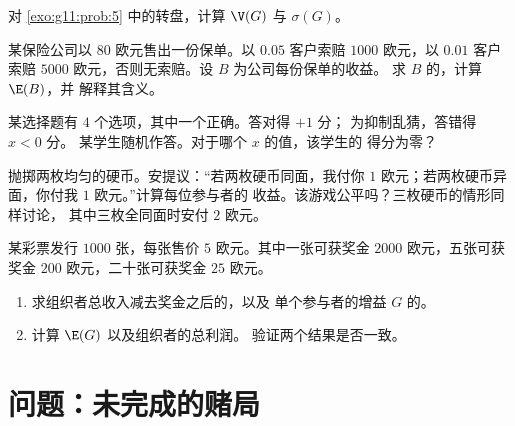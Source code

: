 \begin{exercise}[$\star\star$]\label{exo:g11:prob:7}
对 \cref{exo:g11:prob:5} 中的转盘，计算 $\V(G)$ 与 $\sigma(G)$。
\end{exercise}

\begin{exercise}[$\star\star$]\label{exo:g11:prob:8}
某保险公司以 $80$ 欧元售出一份保单。以
$0.05$ 客户索赔 $1000$ 欧元，以 $0.01$ 客户
索赔 $5000$ 欧元，否则无索赔。设 $B$ 为公司每份保单的收益。
求 $B$ 的，计算 $\E(B)$，并
解释其含义。
\end{exercise}

\begin{exercise}[$\star\star$]\label{exo:g11:prob:9}
某选择题有 $4$ 个选项，其中一个正确。答对得 $+1$ 分；
为抑制乱猜，答错得 $x < 0$ 分。
某学生随机作答。对于哪个 $x$ 的值，该学生的
得分为零？
\end{exercise}

\begin{exercise}[$\star\star$]\label{exo:g11:prob:10}
抛掷两枚均匀的硬币。安提议：“若两枚硬币同面，我付你
$1$ 欧元；若两枚硬币异面，你付我 $1$ 欧元。”计算每位参与者的
收益。该游戏公平吗？三枚硬币的情形同样讨论，
其中三枚全同面时安付 $2$ 欧元。
\end{exercise}

\begin{exercise}[$\star\star\star$]\label{exo:g11:prob:11}
某彩票发行 $1000$ 张，每张售价 $5$ 欧元。其中一张可获奖金
$2000$ 欧元，五张可获奖金 $200$ 欧元，二十张可获奖金 $25$
欧元。
\begin{enumerate}
  \item 求组织者总收入减去奖金之后的，以及
        单个参与者的增益 $G$ 的。
  \item 计算 $\E(G)$ 以及组织者的总利润。
        验证两个结果是否一致。
\end{enumerate}
\end{exercise}

\section{问题：未完成的赌局}

